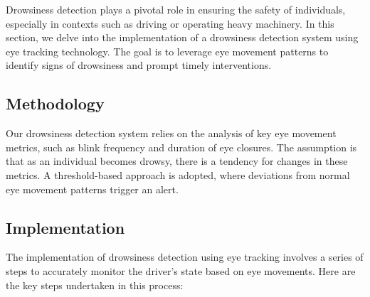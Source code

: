 \documentclass[letterpaper, 10 pt, conference]{ieeeconf}  %
\begin{document}
Drowsiness detection plays a pivotal role in ensuring the safety of individuals, especially in contexts such as driving or operating heavy machinery. In this section, we delve into the implementation of a drowsiness detection system using eye tracking technology. The goal is to leverage eye movement patterns to identify signs of drowsiness and prompt timely interventions.

\subsection{Methodology}

Our drowsiness detection system relies on the analysis of key eye movement metrics, such as blink frequency and duration of eye closures. The assumption is that as an individual becomes drowsy, there is a tendency for changes in these metrics. A threshold-based approach is adopted, where deviations from normal eye movement patterns trigger an alert.

\subsection{Implementation}

The implementation of drowsiness detection using eye tracking involves a series of steps to accurately monitor the driver's state based on eye movements. Here are the key steps undertaken in this process:
\end{document}

